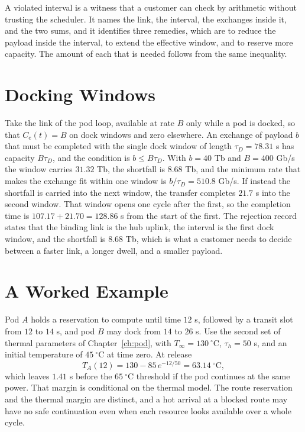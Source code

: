 \documentclass[11pt,openany]{book}
\theoremstyle{plain}
\theoremstyle{definition}
\theoremstyle{remark}
\begin{document}
A violated interval is a witness that a customer can check by arithmetic without trusting the scheduler. It names the link, the interval, the exchanges inside it, and the two sums, and it identifies three remedies, which are to reduce the payload inside the interval, to extend the effective window, and to reserve more capacity. The amount of each that is needed follows from the same inequality.

\section{Docking Windows}

Take the link of the pod loop, available at rate $B$ only while a pod is docked, so that $C_e(t)=B$ on dock windows and zero elsewhere. An exchange of payload $b$ that must be completed with the single dock window of length $\tau_D=78.31$ s has capacity $B\tau_D$, and the condition is $b\le B\tau_D$. With $b=40$ Tb and $B=400$ Gb/s the window carries $31.32$ Tb, the shortfall is $8.68$ Tb, and the minimum rate that makes the exchange fit within one window is $b/\tau_D=510.8$ Gb/s. If instead the shortfall is carried into the next window, the transfer completes $21.7$ s into the second window. That window opens one cycle after the first, so the completion time is $107.17+21.70=128.86$ s from the start of the first. The rejection record states that the binding link is the hub uplink, the interval is the first dock window, and the shortfall is $8.68$ Tb, which is what a customer needs to decide between a faster link, a longer dwell, and a smaller payload.

\section{A Worked Example}

Pod $A$ holds a reservation to compute until time $12$ s, followed by a transit slot from $12$ to $14$ s, and pod $B$ may dock from $14$ to $26$ s. Use the second set of thermal parameters of Chapter~\ref{ch:pod}, with $T_\infty=130\ ^\circ$C, $\tau_h=50$ s, and an initial temperature of $45\ ^\circ$C at time zero. At release
\[
T_A(12)=130-85\,e^{-12/50}=63.14\ ^\circ\mathrm C,
\]
which leaves $1.41$ s before the $65\ ^\circ$C threshold if the pod continues at the same power. That margin is conditional on the thermal model. The route reservation and the thermal margin are distinct, and a hot arrival at a blocked route may have no safe continuation even when each resource looks available over a whole cycle.
\end{document}
